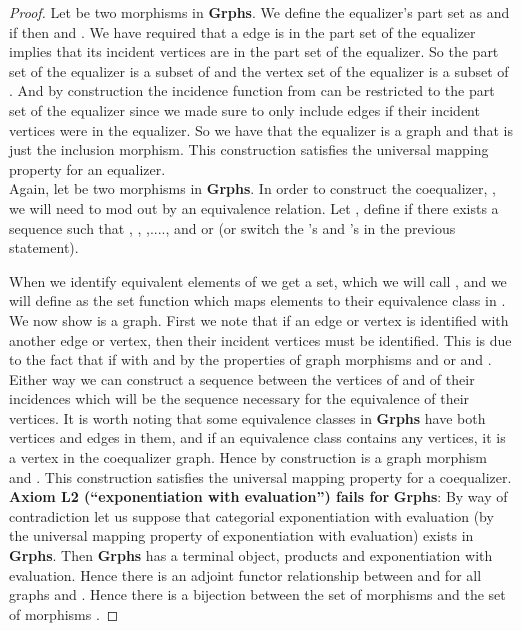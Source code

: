 \documentclass[11pt]{article}
\begin{document}
\begin{proof}
\indent Let  be two morphisms in \textbf{Grphs}. We define the equalizer's part set as  and if \textunderscore then  and . We have required that a edge is in the part set of the equalizer implies that its incident vertices are in the part set of the equalizer. So the part set of the equalizer is a subset of  and the vertex set of the equalizer is a subset of . And by construction the incidence function from  can be restricted to the part set of the equalizer since we made sure to only include edges if their incident vertices were in the equalizer. So we have that the equalizer is a graph and that  is just the inclusion morphism. This construction satisfies the universal mapping property for an equalizer.\\
\indent Again, let  be two morphisms in \textbf{Grphs}.
In order to construct the coequalizer, , we will need to mod out  by an equivalence relation. Let , define  if there exists a sequence  such that , , ,....,  and  or  (or switch the 's and 's in the previous statement). \par
When we identify equivalent elements of  we get a set, which we will call , and we will define  as the set function which maps elements to their equivalence class in .\\
\indent We now show  is a graph. First we note that if an edge or vertex is identified with another edge or vertex, then their incident vertices must be identified. This is due to the fact that if  with \textunderscore and \textunderscore by the properties of graph morphisms  and  or  and . Either way we can construct a sequence between the vertices of  and  of their incidences which will be the sequence necessary for the equivalence of their vertices. It is worth noting that some equivalence classes in \textbf{Grphs} have both vertices and edges in them, and if an equivalence class contains any vertices, it is a vertex in the coequalizer graph. Hence by construction  is a graph morphism and . This construction satisfies the universal mapping property for a coequalizer.\\
\indent \textbf{Axiom L2 (``exponentiation with evaluation'') fails for} \textbf{Grphs}: By way of contradiction let us suppose that categorial exponentiation with evaluation (by the universal mapping property of exponentiation with evaluation) exists in \textbf{Grphs}. Then \textbf{Grphs} has a terminal object, products and exponentiation with evaluation. Hence there is an adjoint functor relationship between  and  for all graphs  and . Hence there is a bijection between the set of morphisms  and the set of morphisms .\par

\end{proof}
\end{document}
